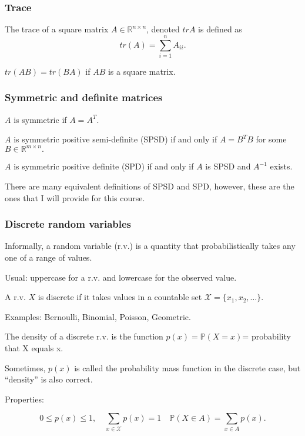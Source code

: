 \documentclass[mathserif]{beamer}
\begin{document}
\begin{frame}
\frametitle{Trace}

The trace of a square matrix $A \in \mathbb{R}^{n \times n}$, denoted $tr{A}$ is defined as 
$$tr(A) = \sum_{i=1}^n A_{ii}.$$

\vspace*{1em}

$tr(AB) = tr(BA)$ if $AB$ is a square matrix. 


\end{frame}

\begin{frame}
\frametitle{Symmetric and definite matrices}

$A$ is symmetric if $A = A^{T}.$

\vspace*{1em}

$A$ is symmetric positive semi-definite (SPSD) if and only if 
$A = B^TB$ for some $B \in \mathbb{R}^{m \times n}.$

\vspace*{1em}

$A$ is symmetric positive definite (SPD) if and only if 
$A$ is SPSD and $A^{-1}$ exists. 

\vspace*{1em}

There are many equivalent definitions of SPSD and SPD, however, these are the ones that I will provide
for this course. 

\end{frame}

\begin{frame}
\frametitle{Discrete random variables}

Informally, a random variable (r.v.) is a quantity that
probabilistically takes any one of a range of values.

\vspace*{0.5em}

Usual: uppercase for a r.v. and lowercase for the observed value. 
\vspace*{0.5em}

A r.v. $X$ is discrete if it takes values in a
countable set $\mathcal{X} = \{x_1, x_2,  \ldots \}.$

\vspace*{0.5em}

Examples: Bernoulli, Binomial, Poisson, Geometric. 

\vspace*{0.5em}
The density of a discrete r.v. is the function
$p(x) = \mathbb{P}(X = x)$= probability that X equals x.

\vspace*{0.5em}

Sometimes, $p(x)$ is called the probability mass function in the
discrete case, but “density” is also correct.

\vspace*{0.5em}

Properties:

$$0 \leq p(x) \leq 1, \quad \sum_{x \in \mathcal{X}} p(x) = 1 \quad \mathbb{P}(X \in A) = \sum_{x \in A} p(x).$$



\end{frame}
\end{document}
